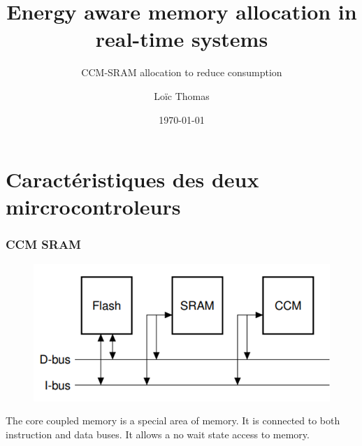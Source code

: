 \documentclass[
	11pt, %
]{beamer}
\title[Short Title]{Energy aware memory allocation in real-time systems} %
\subtitle{CCM-SRAM allocation to reduce consumption} %
\author[]{Loïc Thomas} %
\institute[UC]{LAAS CNRS \\ \smallskip \textit{lthomas@laas.fr}} %
\date[\today]{\today} %
\begin{document}

\begin{frame}
	\titlepage %
\end{frame}



\section{Caractéristiques des deux mircrocontroleurs}

\begin{frame}
    \frametitle{CCM SRAM}
    \begin{figure}
        \includegraphics[scale = 0.7]{images/CCM.png}
    \end{figure}
    The core coupled memory is a special area of memory. 
    It is connected to both instruction and data buses.
    It allows a no wait state access to memory. 
\end{frame}
\end{document}
